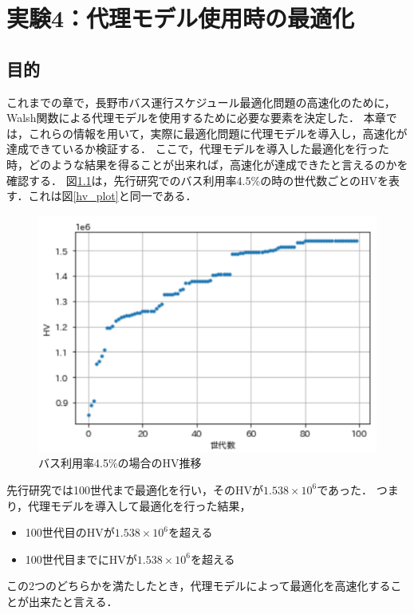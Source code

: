 \documentclass[main]{subfiles}
\begin{document}
\chapter{実験4：代理モデル使用時の最適化}
    \section{目的}
    これまでの章で，長野市バス運行スケジュール最適化問題の高速化のために，
    Walsh関数による代理モデルを使用するために必要な要素を決定した．
    本章では，これらの情報を用いて，実際に最適化問題に代理モデルを導入し，高速化が達成できているか検証する．
    ここで，代理モデルを導入した最適化を行った時，どのような結果を得ることが出来れば，高速化が達成できたと言えるのかを確認する．
    図\ref{hv_plot_}は，先行研究でのバス利用率4.5\%の時の世代数ごとのHVを表す．これは図\ref{hv_plot}と同一である．
    
    \begin{figure}
        \centering
        \includegraphics[width=\linewidth]{figures/hv_plot.png}
        \caption{バス利用率4.5\%の場合のHV推移}
        \label{hv_plot_}
    \end{figure}
    先行研究では100世代まで最適化を行い，そのHVが$1.538\times 10^6$であった．
    つまり，代理モデルを導入して最適化を行った結果，
    \begin{itemize}
        \item 100世代目のHVが$1.538\times 10^6$を超える
        \item 100世代目までにHVが$1.538\times 10^6$を超える
    \end{itemize}
    この2つのどちらかを満たしたとき，代理モデルによって最適化を高速化することが出来たと言える．
    
\end{document}
